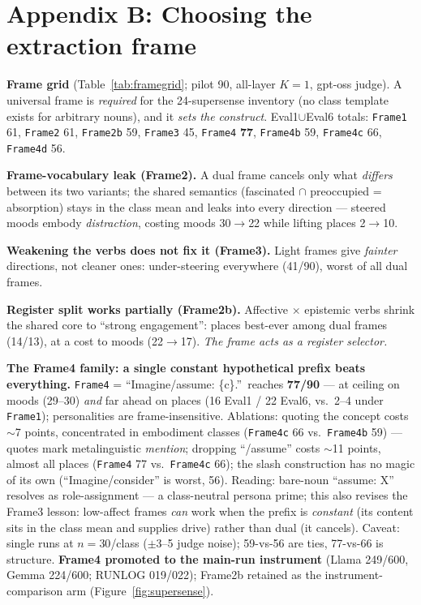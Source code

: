 \section{Appendix B: Choosing the extraction frame}
\begin{outline}
\item [+] \textbf{Frame grid} (Table~\ref{tab:framegrid}; pilot 90, all-layer $K{=}1$, gpt-oss judge). A universal frame is \emph{required} for the 24-supersense inventory (no class template exists for arbitrary nouns), and it \emph{sets the construct}. Eval1$\cup$Eval6 totals: \texttt{Frame1} 61, \texttt{Frame2} 61, \texttt{Frame2b} 59, \texttt{Frame3} 45, \texttt{Frame4} \textbf{77}, \texttt{Frame4b} 59, \texttt{Frame4c} 66, \texttt{Frame4d} 56.
\item [--] \textbf{Frame-vocabulary leak (Frame2).} A dual frame cancels only what \emph{differs} between its two variants; the shared semantics (fascinated $\cap$ preoccupied = absorption) stays in the class mean and leaks into every direction --- steered moods embody \emph{distraction}, costing moods 30$\to$22 while lifting places 2$\to$10.
\item [--] \textbf{Weakening the verbs does not fix it (Frame3).} Light frames give \emph{fainter} directions, not cleaner ones: under-steering everywhere (41/90), worst of all dual frames.
\item [+] \textbf{Register split works partially (Frame2b).} Affective $\times$ epistemic verbs shrink the shared core to ``strong engagement'': places best-ever among dual frames (14/13), at a cost to moods (22$\to$17). \emph{The frame acts as a register selector.}
\item [+] \textbf{The Frame4 family: a single constant hypothetical prefix beats everything.} \texttt{Frame4} = ``Imagine/assume: \{c\}.''\ reaches \textbf{77/90} --- at ceiling on moods (29--30) \emph{and} far ahead on places (16 Eval1 / 22 Eval6, vs.\ 2--4 under \texttt{Frame1}); personalities are frame-insensitive. Ablations: quoting the concept costs $\sim$7 points, concentrated in embodiment classes (\texttt{Frame4c} 66 vs.\ \texttt{Frame4b} 59) --- quotes mark metalinguistic \emph{mention}; dropping ``/assume'' costs $\sim$11 points, almost all places (\texttt{Frame4} 77 vs.\ \texttt{Frame4c} 66); the slash construction has no magic of its own (``Imagine/consider'' is worst, 56). Reading: bare-noun ``assume: X'' resolves as role-assignment --- a class-neutral persona prime; this also revises the Frame3 lesson: low-affect frames \emph{can} work when the prefix is \emph{constant} (its content sits in the class mean and supplies drive) rather than dual (it cancels). Caveat: single runs at $n{=}30$/class ($\pm$3--5 judge noise); 59-vs-56 are ties, 77-vs-66 is structure. \textbf{Frame4 promoted to the main-run instrument} (Llama 249/600, Gemma 224/600; RUNLOG 019/022); Frame2b retained as the instrument-comparison arm (Figure~\ref{fig:supersense}).

\end{outline}
